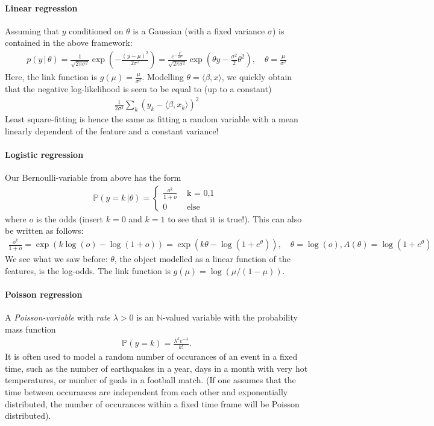 \documentclass{article}
\newcommand{\sprod}[1]{\langle #1 \rangle}
\newcommand{\N}{\mathbb{N}}
\begin{document}
\paragraph{Linear regression} Assuming that $y$ conditioned on $\theta$ is a Gaussian (with a fixed variance $\sigma$) is contained in the above framework:
\begin{align*}
    p(y \, \vert \, \theta) = \frac{1}{\sqrt{2\pi\sigma^2}} \exp\left(-\frac{(y-\mu)^2}{2\sigma^2}\right) = \frac{e^{-\tfrac{y^2}{2\sigma^2}}}{\sqrt{2\pi\sigma^2}}\exp (\theta y - \tfrac{\sigma^2}{2}\theta^2), \quad \theta = \frac{\mu}{\sigma^2}
\end{align*}
Here, the link function is $g(\mu) =\frac{\mu}{\sigma^2}$. Modelling $\theta = \sprod{\beta,x}$, we quickly obtain that the negative log-likelihood is seen to be equal to (up to a constant)
\begin{align*}
    \tfrac{1}{2\sigma^2} \sum_{k}(y_k-\sprod{\beta,x_k})^2
\end{align*}
Least square-fitting is hence the same as fitting a random variable with a mean linearly dependent of the feature and a constant variance!

\paragraph{Logistic regression} Our Bernoulli-variable from above has the form
\begin{align*}
      \mathbb{P}(y=k \, \vert \theta) = \begin{cases} \frac{o^k}{1+o} & \text{ k = 0,1 } \\ 0 & \text{ else} \end{cases}
\end{align*}
where $o$ is the odds (insert $k=0$ and $k=1$ to see that it is true!). This can also be written as follows:
\begin{align*}
    \frac{o^k}{1+o} = \exp(k\log(o)-\log(1+o)) = \exp(k\theta - \log(1+e^\theta)), \quad \theta =\log(o), A(\theta) = \log(1+e^\theta)
\end{align*}
We see what we saw before: $\theta$, the object modelled as a linear function of the features, is the log-odds. The link function is $g(\mu) = \log(\mu/(1-\mu))$.

\paragraph{Poisson regression} A \emph{Poisson-variable} with \emph{rate} $\lambda>0$ is an $\N$-valued variable with the probability mass function
\begin{align*}
    \mathbb{P}(y=k) = \frac{\lambda^ke^{-\lambda}}{k!}.
\end{align*}
It is often used to model a random number of occurances of an event in a fixed time, such as the number of earthquakes in a year, days in a month with very hot temperatures, or number of goals in a football match. (If one assumes that the time between occurances are independent from each other and exponentially distributed, the number of occurances within a fixed time frame will be Poisson distributed).
\end{document}
